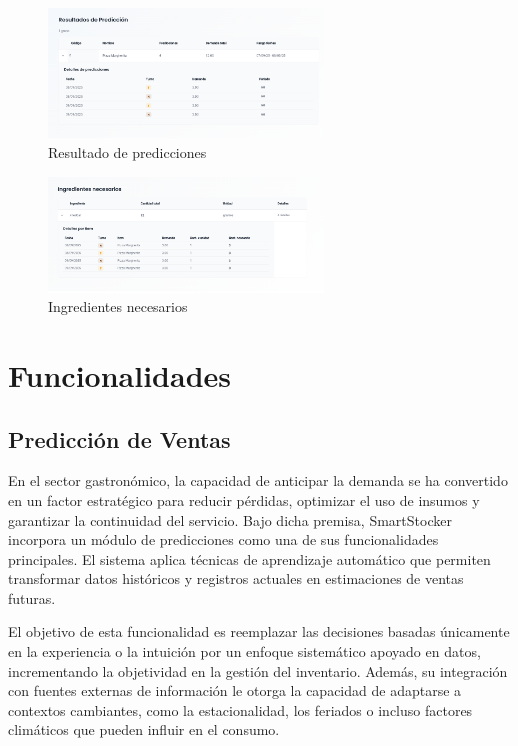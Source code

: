\begin{figure}[htbp]
    \centering
    \includegraphics[width=0.65\textwidth]{images/prediccion1.png}
    \caption{Resultado de predicciones}
    \label{fig:ux-prediccion1}
\end{figure}

\begin{figure}[htbp]
    \centering
    \includegraphics[width=0.65\textwidth]{images/prediccion2.png}
    \caption{Ingredientes necesarios}
    \label{fig:ux-prediccion2}
\end{figure}

\section{Funcionalidades}\label{sec:funcionalidades}

\subsection{Predicción de Ventas}\label{sec:prediccion-ventas}

En el sector gastronómico, la capacidad de anticipar la demanda se ha convertido en un factor estratégico para reducir pérdidas, optimizar el uso de insumos y garantizar la continuidad del servicio. Bajo dicha premisa, SmartStocker incorpora un módulo de predicciones como una de sus funcionalidades principales. El sistema aplica técnicas de aprendizaje automático que permiten transformar datos históricos y registros actuales en estimaciones de ventas futuras. 

El objetivo de esta funcionalidad es reemplazar las decisiones basadas únicamente en la experiencia o la intuición por un enfoque sistemático apoyado en datos, incrementando la objetividad en la gestión del inventario. Además, su integración con fuentes externas de información le otorga la capacidad de adaptarse a contextos cambiantes, como la estacionalidad, los feriados o incluso factores climáticos que pueden influir en el consumo.

